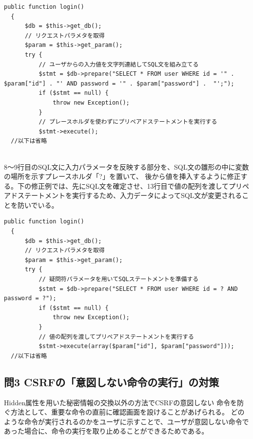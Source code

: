 \documentclass[dvipdfmx,autodetect-engine,titlepage]{jsarticle}
\begin{document}
\begin{lstlisting}[caption=修正前ソースコード,label=1]
  public function login()
  {
      $db = $this->get_db();
      // リクエストパラメタを取得
      $param = $this->get_param();
      try {
          // ユーザからの入力値を文字列連結してSQL文を組み立てる
          $stmt = $db->prepare("SELECT * FROM user WHERE id = '" . $param["id"] . "' AND password = '" . $param["password"] .  "';");
          if ($stmt == null) {
              throw new Exception();
          }
          // プレースホルダを使わずにプリペアドステートメントを実行する
          $stmt->execute();
  //以下は省略
\end{lstlisting}
　\\
8〜9行目のSQL文に入力パラメータを反映する部分を、SQL文の雛形の中に変数の場所を示すプレースホルダ「?」を置いて、
後から値を挿入するように修正する。下の修正例では、先にSQL文を確定させ、13行目で値の配列を渡してプリペアドステートメントを実行するため、入力データによってSQL文が変更されることを防いでいる。\\


\begin{lstlisting}[caption=修正後ソースコード,label=1]
  public function login()
  {
      $db = $this->get_db();
      // リクエストパラメタを取得
      $param = $this->get_param();
      try {
          // 疑問符パラメータを用いてSQLステートメントを準備する
          $stmt = $db->prepare("SELECT * FROM user WHERE id = ? AND password = ?");
          if ($stmt == null) {
              throw new Exception();
          }
          // 値の配列を渡してプリペアドステートメントを実行する
          $stmt->execute(array($param["id"], $param["password"]));
  //以下は省略
\end{lstlisting}

\subsection{問3 CSRFの「意図しない命令の実行」の対策}
Hidden属性を用いた秘密情報の交換以外の方法でCSRFの意図しない
命令を防ぐ方法として、重要な命令の直前に確認画面を設けることがあげられる。
どのような命令が実行されるのかをユーザに示すことで、ユーザが意図しない命令であった場合に、命令の実行を取り止めることができるためである。
\end{document}
